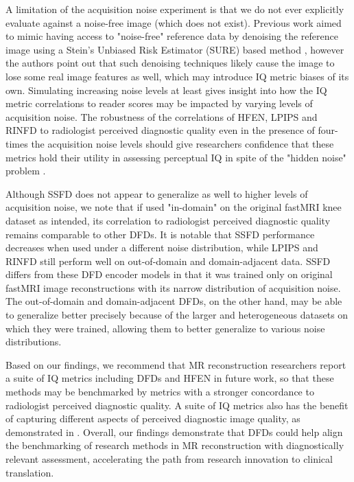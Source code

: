 \documentclass[AMA,STIX2COL,Linenumberson]{MRM}
\begin{document}
A limitation of the acquisition noise experiment is that we do not ever explicitly evaluate against a noise-free image (which does not exist). Previous work aimed to mimic having access to "noise-free" reference data by denoising the reference image using a Stein's Unbiased Risk Estimator (SURE) based method \cite{luisier2008sure}, however the authors point out that such denoising techniques likely cause the image to lose some real image features as well, which may introduce IQ metric biases of its own. Simulating increasing noise levels at least gives insight into how the IQ metric correlations to reader scores may be impacted by varying levels of acquisition noise. The robustness of the correlations of HFEN, LPIPS and RINFD to radiologist perceived diagnostic quality even in the presence of four-times the acquisition noise levels should give researchers confidence that these metrics hold their utility in assessing perceptual IQ in spite of the "hidden noise" problem \cite{wang2024hidden}. 

Although SSFD does not appear to generalize as well to higher levels of acquisition noise, we note that if used "in-domain" on the original fastMRI knee dataset as intended, its correlation to radiologist perceived diagnostic quality remains comparable to other DFDs. It is notable that SSFD performance decreases when used under a different noise distribution, while LPIPS and RINFD still perform well on out-of-domain and domain-adjacent data. SSFD differs from these DFD encoder models in that it was trained only on original fastMRI image reconstructions with its narrow distribution of acquisition noise. The out-of-domain and domain-adjacent DFDs, on the other hand, may be able to generalize better precisely because of the larger and heterogeneous datasets on which they were trained, allowing them to better generalize to various noise distributions.

Based on our findings, we recommend that MR reconstruction researchers report a suite of IQ metrics including DFDs and HFEN in future work, so that these methods may be benchmarked by metrics with a stronger concordance to radiologist perceived diagnostic quality. A suite of IQ metrics also has the benefit of capturing different aspects of perceived diagnostic image quality, as demonstrated in \cite{mason2019comparison}. Overall, our findings demonstrate that DFDs could help align the benchmarking of research methods in MR reconstruction with diagnostically relevant assessment, accelerating the path from research innovation to clinical translation.
\end{document}
